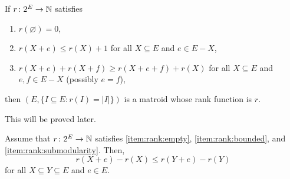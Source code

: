 \begin{proposition}
    If \(r \colon 2^E \to \mathbb{N}\) satisfies
    \begin{enumerate}[label = \textup{(r\arabic*)}]
        \item \(r(\varnothing) = 0\), \label{item:rank:empty}
        \item \(r(X + e) \leq r(X) + 1\) for all \(X \subseteq E\) and \(e \in E - X\), \label{item:rank:bounded}
        \item \(r(X + e) + r(X + f) \geq  r(X + e + f) + r(X)\) for all \(X \subseteq E\) and \(e, f \in E - X\) (possibly \(e = f\)), \label{item:rank:submodularity}
    \end{enumerate}
    then \((E, \{I \subseteq E : r(I) = |I|\})\) is a matroid whose rank function is \(r\).
\end{proposition}

This will be proved later.

\begin{lemma}
    Assume that \(r \colon 2^E \to \mathbb{N}\) satisfies \ref{item:rank:empty}, \ref{item:rank:bounded}, and \ref{item:rank:submodularity}.
    Then,
    \begin{equation}
        r(X + e) - r(X) \leq r(Y + e) - r(Y)
    \end{equation}
    for all \(X \subseteq Y \subseteq E\) and \(e \in E\).
\end{lemma}
